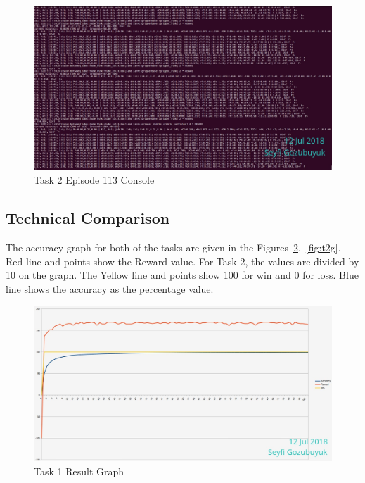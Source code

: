 \documentclass[10pt,journal,compsoc]{IEEEtran}
\begin{document}
\begin{figure}[thpb]
      \centering
      \includegraphics[width=\linewidth]{figures/Task2_Step113_2.png}
      \caption{Task 2 Episode 113 Console}
      \label{fig:t2s1132}
\end{figure}

\subsection{Technical Comparison} %
The accuracy graph for both of the tasks are given in the Figures~\ref{fig:t1g},~\ref{fig:t2g}. Red line and points show the Reward value. For Task 2, the values are divided by 10 on the graph. The Yellow line and points show 100 for win and 0 for loss. Blue line shows the accuracy as the percentage value.
\begin{figure}[thpb]
      \centering
      \includegraphics[width=\linewidth]{figures/Task1.png}
      \caption{Task 1 Result Graph}
      \label{fig:t1g}
\end{figure}
\end{document}
